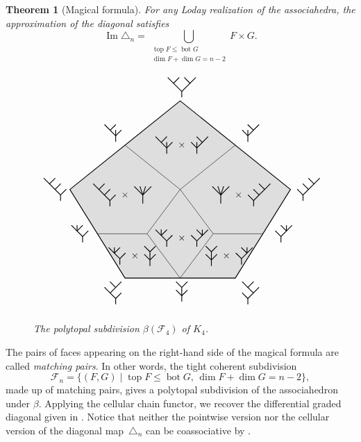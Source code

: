 \documentclass[11pt]{article}
\numberwithin{equation}{section}\providecommand{\No}{}
\let\mathcal\mathscr
\theoremstyle{plain}
\newtheorem{theorem}{Theorem}
\theoremstyle{definition}
\newcommand{\K}{{K}}
\newcommand{\sF}{\mathcal{F}}
\DeclareMathOperator{\tp}{top}
\DeclareMathOperator{\bm}{bot}
\DeclareMathOperator{\im}{\mathrm{Im}}
\newcommand{\TreeLL}
{\vcenter{\hbox{
\begin{tikzpicture}[yscale=0.2,xscale=0.2]
\draw[thick] (0,-1)--(0,0) -- (-3,3);
\draw[thick] (-1,1)--(0,2) ;
\draw[thick] (-2,2)--(-1,3) ;
\draw[thick] (0,0)--(1,1) ;
\draw [fill] (0,-1) circle [radius=0.035];
\draw [fill] (-2,2) circle [radius=0.035];
\draw [fill] (0,2) circle [radius=0.035];
\draw [fill] (1,1) circle [radius=0.035];
\draw [fill] (-3,3) circle [radius=0.035];
\draw [fill] (-1,3) circle [radius=0.035];
\end{tikzpicture}}}}
\newcommand{\TreeLR}
{\vcenter{\hbox{
\begin{tikzpicture}[yscale=0.2,xscale=0.2]
\draw[thick] (0,-1)--(0,0) -- (-2,2);
\draw[thick] (-1,1)--(1,3) ;
\draw[thick] (0,0)--(1,1) ;
\draw[thick] (0,2)--(-1,3) ;
\draw [fill] (0,-1) circle [radius=0.035];
\draw [fill] (-2,2) circle [radius=0.035];
\draw [fill] (0,2) circle [radius=0.035];
\draw [fill] (1,1) circle [radius=0.035];
\draw [fill] (-1,3) circle [radius=0.035];
\draw [fill] (1,3) circle [radius=0.035];
\end{tikzpicture}}}}
\newcommand{\TreeRR}
{\vcenter{\hbox{
\begin{tikzpicture}[yscale=0.2,xscale=0.2]
\draw[thick] (0,-1)--(0,0) -- (3,3);
\draw[thick] (1,1)--(0,2) ;
\draw[thick] (2,2)--(1,3) ;
\draw[thick] (0,0)--(-1,1) ;
\draw [fill] (0,-1) circle [radius=0.035];
\draw [fill] (2,2) circle [radius=0.035];
\draw [fill] (0,2) circle [radius=0.035];
\draw [fill] (-1,1) circle [radius=0.035];
\draw [fill] (3,3) circle [radius=0.035];
\draw [fill] (1,3) circle [radius=0.035];
\end{tikzpicture}}}}
\newcommand{\TreeRL}
{\vcenter{\hbox{
\begin{tikzpicture}[yscale=0.2,xscale=0.2]
\draw[thick] (0,-1)--(0,0) -- (2,2);
\draw[thick] (1,1)--(-1,3) ;
\draw[thick] (0,0)--(-1,1) ;
\draw[thick] (0,2)--(1,3) ;
\draw [fill] (0,-1) circle [radius=0.035];
\draw [fill] (2,2) circle [radius=0.035];
\draw [fill] (0,2) circle [radius=0.035];
\draw [fill] (-1,1) circle [radius=0.035];
\draw [fill] (1,3) circle [radius=0.035];
\draw [fill] (-1,3) circle [radius=0.035];
\end{tikzpicture}}}}
\newcommand{\TreeCC}
{\vcenter{\hbox{
\begin{tikzpicture}[yscale=0.2,xscale=0.2]
\draw[thick] (0,-1)--(0,0) -- (-2.5,2.5);
\draw[thick] (-1.5,1.5)--(-0.5,2.5) ;
\draw[thick] (1.5,1.5)--(0.5,2.5) ;
\draw[thick] (0,0)--(2.5,2.5) ;
\draw [fill] (0,-1) circle [radius=0.035];
\draw [fill] (-2.5,2.5) circle [radius=0.035];
\draw [fill] (-0.5,2.5) circle [radius=0.035];
\draw [fill] (0.5,2.5) circle [radius=0.035];
\draw [fill] (2.5,2.5) circle [radius=0.035];
\end{tikzpicture}}}}
\newcommand{\TreeAL}
{\vcenter{\hbox{
\begin{tikzpicture}[yscale=0.2,xscale=0.2]
\draw[thick] (0,-1)--(0,0) -- (-2,2);
\draw[thick] (-1,1)--(0,2) ;
\draw[thick] (0,0)--(1,1) ;
\draw[thick] (-1,1)--(-1,2) ;
\draw [fill] (0,-1) circle [radius=0.035];
\draw [fill] (-2,2) circle [radius=0.035];
\draw [fill] (0,2) circle [radius=0.035];
\draw [fill] (1,1) circle [radius=0.035];
\draw [fill] (-1,2) circle [radius=0.035];
\end{tikzpicture}}}}
\newcommand{\TreeRA}
{\vcenter{\hbox{
\begin{tikzpicture}[yscale=0.2,xscale=0.2]
\draw[thick] (0,-1)--(0,0) -- (2,2);
\draw[thick] (1,1)--(0,2) ;
\draw[thick] (0,0)--(-1,1) ;
\draw[thick] (1,1)--(1,2) ;
\draw [fill] (0,-1) circle [radius=0.035];
\draw [fill] (2,2) circle [radius=0.035];
\draw [fill] (0,2) circle [radius=0.035];
\draw [fill] (-1,1) circle [radius=0.035];
\draw [fill] (1,2) circle [radius=0.035];
\end{tikzpicture}}}}
\newcommand{\TreeAR}
{\vcenter{\hbox{
\begin{tikzpicture}[yscale=0.2,xscale=0.2]
\draw[thick] (0,-1)--(0,0) -- (2,2);
\draw[thick] (1,1)--(0,2) ;
\draw[thick] (0,0)--(-1,1) ;
\draw[thick] (0,0)--(0,1) ;
\draw [fill] (0,-1) circle [radius=0.035];
\draw [fill] (2,2) circle [radius=0.035];
\draw [fill] (0,2) circle [radius=0.035];
\draw [fill] (-1,1) circle [radius=0.035];
\draw [fill] (0,1) circle [radius=0.035];
\end{tikzpicture}}}}
\newcommand{\TreeLA}
{\vcenter{\hbox{
\begin{tikzpicture}[yscale=0.2,xscale=0.2]
\draw[thick] (0,-1)--(0,0) -- (-2,2);
\draw[thick] (-1,1)--(0,2) ;
\draw[thick] (0,0)--(1,1) ;
\draw[thick] (0,0)--(0,1) ;
\draw [fill] (0,-1) circle [radius=0.035];
\draw [fill] (-2,2) circle [radius=0.035];
\draw [fill] (0,2) circle [radius=0.035];
\draw [fill] (1,1) circle [radius=0.035];
\draw [fill] (0,1) circle [radius=0.035];
\end{tikzpicture}}}}
\newcommand{\TreeCA}
{\vcenter{\hbox{
\begin{tikzpicture}[yscale=0.2,xscale=0.2]
\draw[thick] (0,-1)--(0,0) -- (-1,1);
\draw[thick] (0,1.5)--(1,2.5) ;
\draw[thick] (0,1.5)--(-1,2.5) ;
\draw[thick] (0,0)--(1,1) ;
\draw[thick] (0,0)--(0,1.5) ;
\draw [fill] (0,-1) circle [radius=0.035];
\draw [fill] (-1,1) circle [radius=0.035];
\draw [fill] (1,2.5) circle [radius=0.035];
\draw [fill] (-1,2.5) circle [radius=0.035];
\draw [fill] (1,1) circle [radius=0.035];
\draw [fill] (0,1) circle [radius=0.035];
\end{tikzpicture}}}}
\newcommand{\TreeC}
{\vcenter{\hbox{
\begin{tikzpicture}[yscale=0.2,xscale=0.2]
\draw[thick] (0,-1.5)--(0,0);
\draw[thick] (0,0)--(1.5,1.5) ;
\draw[thick] (0,0)--(0.5,1.5) ;
\draw[thick] (0,0)--(-0.5,1.5) ;
\draw[thick] (0,0)--(-1.5,1.5) ;
\draw [fill] (0,-1.5) circle [radius=0.035];
\draw [fill] (1.5,1.5) circle [radius=0.035];
\draw [fill] (0.5,1.5) circle [radius=0.035];
\draw [fill] (-1.5,1.5) circle [radius=0.035];
\draw [fill] (-0.5,1.5) circle [radius=0.035];
\end{tikzpicture}}}}
\begin{document}
\begin{theorem}[Magical formula]\label{thm:MagicFormula}
For any Loday realization of the associahedra, the approximation of the diagonal satisfies
\[{\im \triangle_n
=\bigcup_{\substack{\tp F\leq \bm G\\ \dim F+\dim G=n-2}} F\times G}.\]
\begin{figure}[htb]
\[
\begin{tikzpicture}[scale=0.8]
\draw[thick] (-5,0)--(0,4)--(5,0)--(2.5,-4)--(-2.5,-4)--cycle;
\draw[fill, opacity=0.12] (-5,0)--(0,4)--(5,0)--(2.5,-4)--(-2.5,-4)--cycle;

\draw (-2.5,2)--(0,0)--(-1.5,-2)--(-3.75,-2);
\draw (2.5,2)--(0,0)--(1.5,-2)--(3.75,-2);
\draw (-1.5,-2)--(0,-4)--(1.5,-2);

\draw (-2.7,-0.25) node {$\TreeLL\ \times\TreeC$};
\draw (2.7,-0.25) node {$\TreeC\ \times\TreeRR$};
\draw (0,-2.2) node {$\TreeAL\ \times\TreeRA$};
\draw (0,2) node {$\TreeLA\ \times\TreeAR$};
\draw (-2.25,-3) node {$\TreeAL\ \times\TreeCA$};
\draw (2.15,-3) node {$\TreeCA\ \times\TreeRA$};

\draw (-5,0) node[left] {$\TreeLL$};
\draw (5,0) node[right] {$\TreeRR$};
\draw (0,4) node[above] {$\TreeCC$};
\draw (-2.5,-4) node[below left] {$\TreeLR$};
\draw (2.5,-4) node[below right] {$\TreeRL$};
\draw (-4,-2) node[left] {$\TreeAL$};
\draw (4,-2) node[right] {$\TreeRA$};
\draw (-2.5,2) node[above left] {$\TreeLA$};
\draw (2.5,2) node[above right] {$\TreeAR$};
\draw (0,-4) node[below] {$\TreeCA$};
\end{tikzpicture}
\]
\caption{The polytopal subdivision $\beta\left(\sF_4\right)$ of $\K_4$.}
\end{figure}
\end{theorem}

The pairs of faces appearing on the right-hand side of the magical formula are called \emph{matching pairs}.
In other words, the tight coherent subdivision
\[
\sF_n=\{ (F,G) \mid \tp F\leq \bm G,\, \dim F+\dim G=n-2\},
\]
made up of matching pairs, gives a polytopal subdivision of the associahedron under $\beta$.
Applying the cellular chain functor, we recover the differential graded diagonal given in \cite{SaneblidzeUmble04, MarklShnider06}. Notice that neither the pointwise version nor the cellular version of the diagonal map~$\triangle_n$ can be coassociative by \cite[Th.\,13]{MarklShnider06}.
\end{document}
